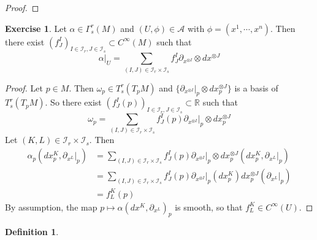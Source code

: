 \documentclass[12pt]{amsart}
\theoremstyle{definition}
\newtheorem{defn}[definition]{Definition}
\newtheorem{ex}[definition]{Exercise}
\newcommand{\al}{\alpha}
\newcommand{\Gam}{\Gamma}
\newcommand{\om}{\omega}
\newcommand{\R}{\mathbb{R}}
\newcommand{\MA}{\mathcal{A}}
\newcommand{\MI}{\mathcal{I}}
\begin{document}
	\begin{proof}
	
	\end{proof}
	
	\begin{ex}
		Let $\al \in \Gam^r_s(M)$ and $(U, \phi) \in \MA$ with $\phi = (x^1, \cdots, x^n)$. Then there exist $(f^I_J)_{I \in \MI_r, J \in \MI_s} \subset C^{\infty}(M)$ such that $$\al|_U = \sum_{(I,J) \in \MI_r \times \MI_s} f^I_J \partial_{x^{\otimes I}} \otimes dx^{\otimes J}$$ 
	\end{ex}

	\begin{proof}
		Let $p \in M$. Then $\om_p \in T^r_s(T_pM)$ and $\bigg \{\partial_{x^{\otimes I}}|_p \otimes dx^{\otimes J}_p \bigg \}$ is a basis of $T^r_s(T_pM)$. So there exist $(f^I_J(p))_{I \in \MI_r, J \in \MI_s } \subset \R$ such that $$\om_p = \sum\limits_{(I,J) \in \MI_r \times \MI_s } f^I_J(p) \partial_{x^{\otimes I}}|_p \otimes dx^{\otimes J}_p $$
		Let $(K,L) \in \MI_r \times \MI_s$. Then 
		\begin{align*}
		\al_p(dx^K_p, \partial_{x^L}|_p) 
		&=  \sum\limits_{(I,J) \in \MI_r \times \MI_s } f^I_J(p) \partial_{x^{\otimes I}}|_p \otimes dx^{\otimes J}_p(dx^K_p, \partial_{x^L}|_p) \\
		&= \sum\limits_{(I,J) \in \MI_r \times \MI_s } f^I_J(p) \partial_{x^{\otimes I}}|_p (dx^K_p) dx^{\otimes J}_p(\partial_{x^L}|_p)  \\
		&= f^K_L(p)
		\end{align*}
		By assumption, the map $p \mapsto \al(dx^K, \partial_{x^L})_p$ is smooth, so that $f^K_L \in C^{\infty}(U)$.
	
	\end{proof}
	
	\begin{defn}
	
	\end{defn}	
	
	
	
	
	
	
	
	
	
	
	
	
	
	
	
	
	
	
	
	
	
	
	
	
	
	
	
	
	
\end{document}
